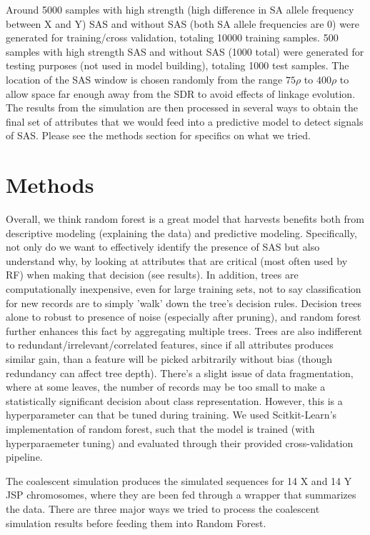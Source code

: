 \documentclass[10pt]{article}
\begin{document}
Around 5000 samples with high strength (high difference in SA allele frequency between X and Y) SAS and without SAS (both SA allele frequencies are 0) were generated for training/cross validation, totaling 10000 training samples. 500 samples with high strength SAS and without SAS (1000 total) were generated for testing purposes (not used in model building), totaling 1000 test samples. The location of the SAS window is chosen randomly from the range $75 \rho$ to $400 \rho$ to allow space far enough away from the SDR to avoid effects of linkage evolution. The results from the simulation are then processed in several ways to obtain the final set of attributes that we would feed into a predictive model to detect signals of SAS. Please see the methods section for specifics on what we tried. 

\section{Methods}

Overall, we think random forest is a great model that harvests benefits both from descriptive modeling (explaining the data) and predictive modeling. Specifically, not only do we want to effectively identify the presence of SAS but also understand why, by looking at attributes that are critical (most often used by RF) when making that decision (see results). In addition, trees are computationally inexpensive, even for large training sets, not to say classification for new records are to simply 'walk' down the tree's decision rules. Decision trees alone to robust to presence of noise (especially after pruning), and random forest further enhances this fact by aggregating multiple trees. Trees are also indifferent to redundant/irrelevant/correlated features, since if all attributes produces similar gain, than a feature will be picked arbitrarily without bias (though redundancy can affect tree depth). There's a slight issue of data fragmentation, where at some leaves, the number of records may be too small to make a statistically significant decision about class representation. However, this is a hyperparameter can that be tuned during training. We used Scitkit-Learn's implementation of random forest, such that the model is trained (with hyperparaemeter tuning) and evaluated through their provided cross-validation pipeline.

The coalescent simulation produces the simulated sequences for 14 X and 14 Y JSP chromosomes, where they are been fed through a wrapper that summarizes the data. There are three major ways we tried to process the coalescent simulation results before feeding them into Random Forest.
\end{document}
